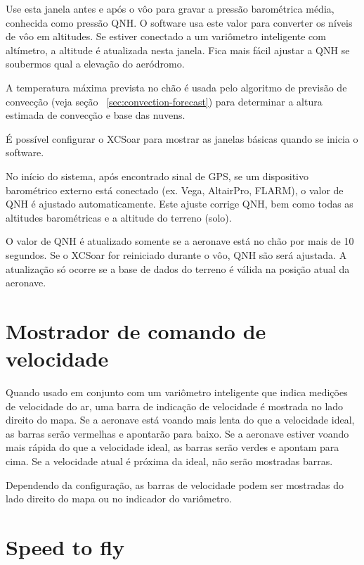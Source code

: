 Use esta janela antes e após o vôo para gravar a pressão barométrica média, conhecida como pressão QNH.  O software usa este valor para converter os níveis de vôo em altitudes.  Se estiver conectado a um variômetro inteligente com altímetro, a altitude é atualizada nesta janela.  Fica mais fácil ajustar a QNH se soubermos qual a elevação do aeródromo.

A temperatura máxima prevista no chão é usada pelo algoritmo de previsão de convecção (veja seção ~\ref{sec:convection-forecast}) para determinar a altura estimada de convecção e base das nuvens.

\tip É possível configurar o XCSoar para mostrar as janelas básicas quando se inicia o software.

No início do sistema, após encontrado sinal de GPS, se um dispositivo barométrico externo está conectado (ex. Vega, AltairPro, FLARM), o valor de QNH é ajustado automaticamente.  Este ajuste corrige QNH, bem como todas as altitudes barométricas e a altitude do terreno (solo).

O valor de QNH é atualizado somente se a aeronave está no chão por mais de 10 segundos.  Se o XCSoar for reiniciado durante o vôo, QNH são será ajustada.   A atualização só ocorre se a base de dados do terreno é válida na posição atual da aeronave.

\section{Mostrador de comando de velocidade}

Quando usado em conjunto com um variômetro inteligente que indica medições de velocidade do ar, uma barra de indicação de velocidade é mostrada no lado direito do mapa.  Se a aeronave está voando mais lenta do que a velocidade ideal, as barras serão vermelhas e apontarão para baixo.  Se a aeronave estiver voando mais rápida do que a velocidade ideal, as barras serão verdes e apontam para cima.  Se a velocidade atual é próxima da ideal, não serão mostradas barras.


Dependendo da configuração, as barras de velocidade podem ser mostradas do lado direito do mapa ou no indicador do variômetro. 

\section{Speed to fly}\label{sec:stf}

